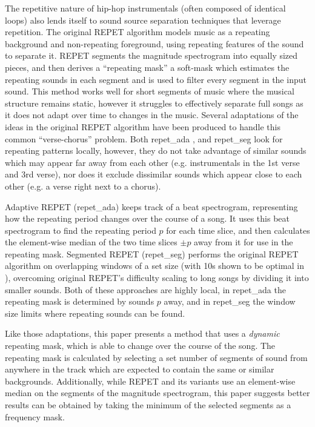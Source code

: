 \documentclass{article}
\begin{document}
The repetitive nature of hip-hop instrumentals (often composed of identical loops) also lends itself to sound source separation techniques that leverage repetition. The original REPET algorithm\cite{REPET} models music as a repeating background and non-repeating foreground, using repeating features of the sound to separate it. REPET segments the magnitude spectrogram into equally sized pieces, and then derives a ``repeating mask'' a soft-mask which estimates the repeating sounds in each segment and is used to filter every segment in the input sound. This method works well for short segments of music where the musical structure remains static, however it struggles to effectively separate full songs as it does not adapt over time to changes in the music. Several adaptations of the ideas in the original REPET algorithm have been produced to handle this common ``verse-chorus'' problem. Both repet\_ada \cite{filtering}, and repet\_seg \cite{REPET} look for repeating patterns locally, however, they do not take advantage of similar sounds which may appear far away from each other (e.g. instrumentals in the 1st verse and 3rd verse), nor does it exclude dissimilar sounds which appear close to each other (e.g. a verse right next to a chorus). 

Adaptive REPET (repet\_ada)\cite{filtering} keeps track of a beat spectrogram, representing how the repeating period changes over the course of a song. It uses this beat spectrogram to find the repeating period $p$ for each time slice, and then calculates the element-wise median of the two time slices $\pm p$ away from it for use in the repeating mask. Segmented REPET (repet\_seg)\cite{REPET} performs the original REPET algorithm on overlapping windows of a set size (with 10s shown to be optimal in \cite{REPET}), overcoming original REPET's difficulty scaling to long songs by dividing it into smaller sounds. Both of these approaches are highly local, in repet\_ada the repeating mask is determined by sounds $p$ away, and in repet\_seg the window size limits where repeating sounds can be found.

Like those adaptations, this paper presents a method that uses a \emph{dynamic} repeating mask, which is able to change over the course of the song. The repeating mask is calculated by selecting a set number of segments of sound from anywhere in the track which are expected to contain the same or similar backgrounds. Additionally, while REPET and its variants use an element-wise median on the segments of the magnitude spectrogram, this paper suggests better results can be obtained by taking the minimum of the selected segments as a frequency mask. 
\end{document}
